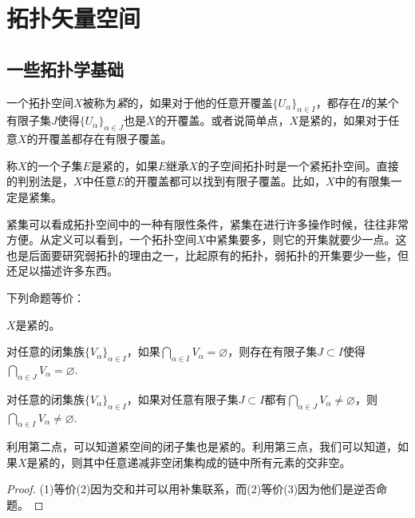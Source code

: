 \chapter{拓扑矢量空间}

\section{一些拓扑学基础}

一个拓扑空间$X$被称为\textit{紧}的，如果对于他的任意开覆盖$\{U_\alpha\}_{\alpha\in I}$，都存在$I$的某个有限子集$J$使得$\{U_\alpha\}_{\alpha\in J}$也是$X$的开覆盖。或者说简单点，$X$是紧的，如果对于任意$X$的开覆盖都存在有限子覆盖。

称$X$的一个子集$E$是紧的，如果$E$继承$X$的子空间拓扑时是一个紧拓扑空间。直接的判别法是，$X$中任意$E$的开覆盖都可以找到有限子覆盖。比如，$X$中的有限集一定是紧集。

紧集可以看成拓扑空间中的一种有限性条件，紧集在进行许多操作时候，往往非常方便。从定义可以看到，一个拓扑空间$X$中紧集要多，则它的开集就要少一点。这也是后面要研究弱拓扑的理由之一，比起原有的拓扑，弱拓扑的开集要少一些，但还足以描述许多东西。

\begin{pro}
下列命题等价：
\begin{compactenum}[(1)]
\item $X$是紧的。

\item 对任意的闭集族$\{V_\alpha\}_{\alpha\in I}$，如果$\bigcap_{\alpha\in I} V_\alpha=\varnothing$，则存在有限子集$J\subset I$使得$\bigcap_{\alpha\in J} V_\alpha=\varnothing$.

\item 对任意的闭集族$\{V_\alpha\}_{\alpha\in I}$，如果对任意有限子集$J\subset I$都有$\bigcap_{\alpha\in J} V_\alpha\neq\varnothing$，则$\bigcap_{\alpha\in I} V_\alpha\neq\varnothing$.
\end{compactenum}
\end{pro}

利用第二点，可以知道紧空间的闭子集也是紧的。利用第三点，我们可以知道，如果$X$是紧的，则其中任意递减非空闭集构成的链中所有元素的交非空。

\begin{proof}
	(1)等价(2)因为交和并可以用补集联系，而(2)等价(3)因为他们是逆否命题。
\end{proof}

